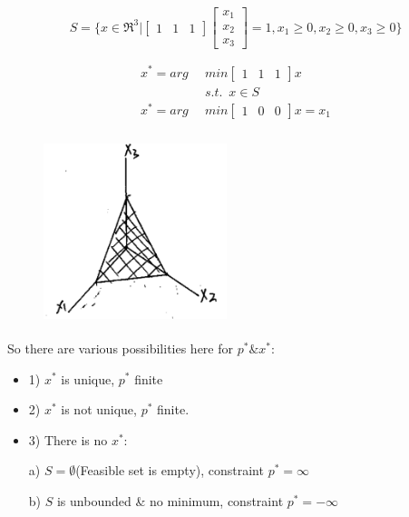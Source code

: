 \begin{equation*}
S = \{x\in \Re^3 | 
\begin{bmatrix}
1 & 1 & 1
\end{bmatrix}
\begin{bmatrix}
x_1\\
x_2\\
x_3
\end{bmatrix}
 = 1, x_1 \geq 0, x_2\geq 0,x_3\geq 0
 \}
\end{equation*}

\begin{align*}
x^* = arg\,\,\, &min 
\begin{bmatrix}
1&1&1
\end{bmatrix}x\\
&s.t. \,\,\, x\in S\\
x^* = arg\,\,\, &min 
\begin{bmatrix}
1&0&0
\end{bmatrix}x = x_1\\
\end{align*}

\begin{figure}
	\centering
	\includegraphics[width=2.1in,height=2.1in]{figures/ch07/figure1012_7.png}
\end{figure}

So there are various possibilities here for $p^* \& x^* $:

\begin{itemize}
	\item 1) $x^*$ is unique, $p^*$ finite
	
	\item 2) $x^*$ is not unique, $p^*$ finite. 
	
	\item 3) There is no $x^*$:
	
		a) $S = \emptyset$(Feasible set is empty), constraint $p^* = \infty$
	
		b) $S$ is unbounded \& no minimum, constraint $p^* = -\infty$
\end{itemize}


